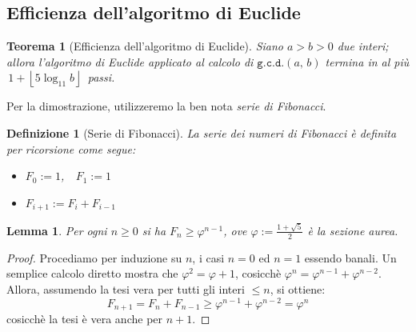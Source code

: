 \documentclass[pdflatex,11pt,a4paper,oneside]{article}
\let\OldEmph\emph
\renewcommand{\emph}[1]{\OldEmph{#1\/}}
\let\gold=\varphi
\newcommand{\floor}[1]{\left\lfloor{#1}\right\rfloor}
\newcommand{\gcdop}[0]{\ensuremath{\mathtt{g.c.d.}}}
\newcommand{\xgcd}[1]{\ensuremath{\gcdop\left({#1}\right)}}
\renewcommand{\gcd}[2]{\xgcd{{#1},\,{#2}}}
\newtheorem{theorem}[TheoremLike]{Teorema}
\newtheorem{definition}[TheoremLike]{Definizione}
\newtheorem{lemma}[TheoremLike]{Lemma}
\begin{document}

\subsection{Efficienza dell'algoritmo di Euclide}

\begin{theorem}[Efficienza dell'algoritmo di Euclide]
Siano $a > b > 0$ due interi; allora l'algoritmo di Euclide
applicato al calcolo di $\gcd{a}{b}$ termina in al pi\`u
\,$1 + \floor{5 \log_{11} b}$\, passi.
\end{theorem}

\smallskip
\noindent
Per la dimostrazione, utilizzeremo la ben nota \emph{serie di Fibonacci}.

\begin{definition}[Serie di Fibonacci]
La serie dei numeri di Fibonacci \`e definita per ricorsione come segue:
  \begin{itemize}
    \item $F_0 := 1$,~~$F_1 := 1$
    \item $F_{i+1} := F_i + F_{i-1}$
  \end{itemize}
\end{definition}

\begin{lemma}
Per ogni $n \geq 0$ si ha $F_n \geq \gold^{n-1}$, ove $\gold :=
\frac{1 + \sqrt{5}}{2}$ \`e la sezione aurea.
\end{lemma}
%
\begin{proof}
Procediamo per induzione su $n$, i casi $n = 0$ ed $n = 1$ essendo banali.
Un semplice calcolo diretto mostra che $\gold^2 = \gold + 1$, cosicch\`e
$\gold^{n} = \gold^{n-1} + \gold^{n-2}$.  Allora, assumendo la tesi vera
per tutti gli interi $\leq n$, si ottiene:
  $$F_{n+1} = F_n + F_{n-1} \geq \gold^{n-1} + \gold^{n-2} = \gold^{n}$$
cosicch\`e la tesi \`e vera anche per $n + 1$.
\end{proof}
\end{document}
